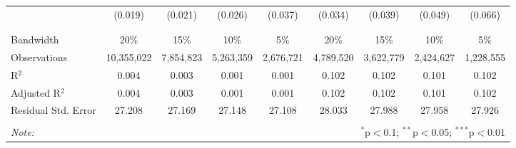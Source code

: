 \begin{sidewaystable}[!htbp]
\begin{adjustbox}{scale = 0.85}
\begin{tabular}{@{\extracolsep{5pt}}lcccccccc}
  & (0.019) & (0.021) & (0.026) & (0.037) & (0.034) & (0.039) & (0.049) & (0.066) \\ 
  & & & & & & & & \\ 
\hline \\[-1.8ex] 
Bandwidth & 20\% & 15\% & 10\% & 5\% & 20\% & 15\% & 10\% & 5\% \\ 
Observations & 10,355,022 & 7,854,823 & 5,263,359 & 2,676,721 & 4,789,520 & 3,622,779 & 2,424,627 & 1,228,555 \\ 
R$^{2}$ & 0.004 & 0.003 & 0.001 & 0.001 & 0.102 & 0.102 & 0.101 & 0.102 \\ 
Adjusted R$^{2}$ & 0.004 & 0.003 & 0.001 & 0.001 & 0.102 & 0.102 & 0.101 & 0.102 \\ 
Residual Std. Error & 27.208 & 27.169 & 27.148 & 27.108 & 28.033 & 27.988 & 27.958 & 27.926 \\ 
\hline 
\hline \\[-1.8ex] 
\textit{Note:}  & \multicolumn{8}{r}{$^{*}$p$<$0.1; $^{**}$p$<$0.05; $^{***}$p$<$0.01} \\ 
\end{tabular}

\end{adjustbox}

\end{sidewaystable} 
